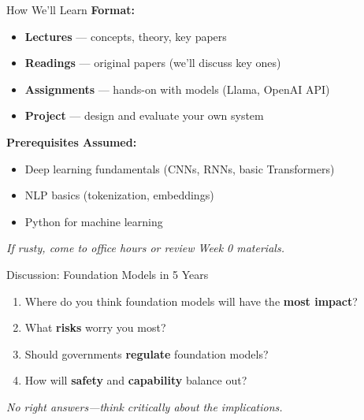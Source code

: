 \documentclass[aspectratio=169,10pt]{beamer}
\begin{document}
\begin{frame}{How We'll Learn}
  \textbf{Format:}
  \begin{itemize}
    \item \textbf{Lectures} — concepts, theory, key papers
    \item \textbf{Readings} — original papers (we'll discuss key ones)
    \item \textbf{Assignments} — hands-on with models (Llama, OpenAI API)
    \item \textbf{Project} — design and evaluate your own system
  \end{itemize}

  \vspace{0.3cm}

  \textbf{Prerequisites Assumed:}
  \begin{itemize}
    \item Deep learning fundamentals (CNNs, RNNs, basic Transformers)
    \item NLP basics (tokenization, embeddings)
    \item Python for machine learning
  \end{itemize}

  \vspace{0.3cm}

  \textit{If rusty, come to office hours or review Week 0 materials.}
\end{frame}

\begin{frame}{Discussion: Foundation Models in 5 Years}
  \begin{enumerate}
    \item Where do you think foundation models will have the \textbf{most impact}?
    \item What \textbf{risks} worry you most?
    \item Should governments \textbf{regulate} foundation models?
    \item How will \textbf{safety} and \textbf{capability} balance out?
  \end{enumerate}

  \vspace{0.3cm}

  \textit{No right answers---think critically about the implications.}
\end{frame}
\end{document}
